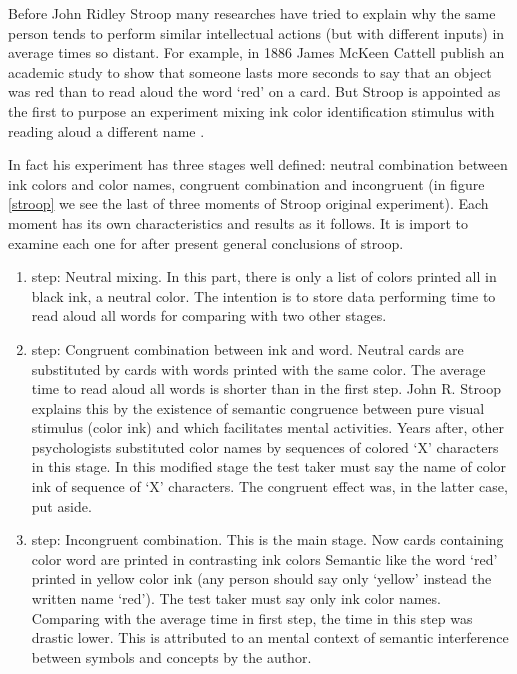 Before John Ridley Stroop many researches have tried to explain why the same person tends to perform similar intellectual actions (but with different inputs) in average times so distant. For example, in 1886 James McKeen Cattell publish an academic study to show that someone lasts more seconds to say that an object was red than to read aloud the word `red' on a card. But Stroop is appointed as the first to purpose an experiment mixing ink color identification stimulus with reading aloud a different name \citep{macleod}. 

In fact his experiment has three stages well defined: neutral combination between ink colors and color names, congruent combination and incongruent (in figure \ref{stroop} we see the last of three moments of Stroop original experiment). Each moment has its own characteristics and results as it follows. It is import to examine each one for after present general conclusions of stroop. 

\begin{enumerate}
\item step: Neutral mixing. In this part, there is only a list of colors printed all in black ink, a neutral color. The intention is to store data performing time to read aloud all words for comparing with two other stages.

\item step: Congruent combination between ink and word. Neutral cards are substituted by cards with words printed with the same color. The average time to read aloud all words is shorter than in the first step. John R. Stroop explains this by the existence of semantic congruence between pure visual stimulus (color ink) and which facilitates mental activities. Years after, other psychologists substituted color names by sequences of colored `X' characters in this stage. In this modified stage the test taker must say the name of color ink of sequence of `X' characters. The congruent effect was, in the latter case, put aside.

\item step: Incongruent combination. This is the main stage. Now cards containing color word are printed in contrasting ink colors Semantic like the word `red' printed in yellow color ink (any person should say only `yellow' instead the written name `red'). The test taker must say only ink color names. Comparing with the average time in first step, the time in this step was drastic lower. This is attributed to an mental context of semantic interference between symbols and concepts by the author.

\end{enumerate}

